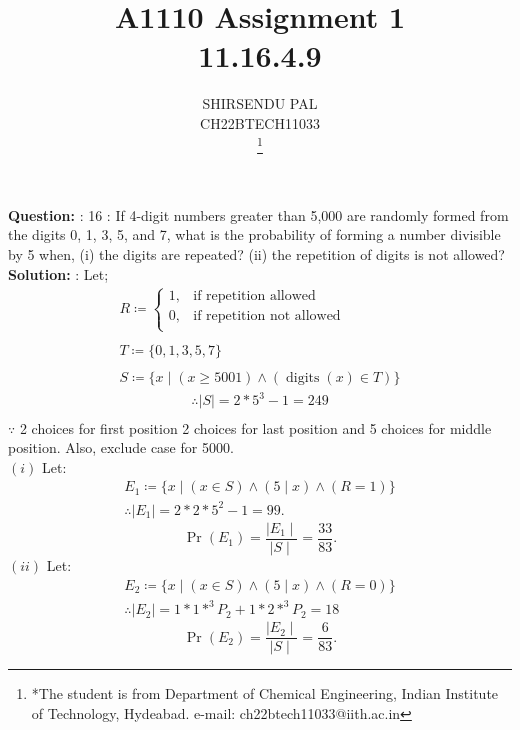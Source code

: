 \documentclass[journal,12pt,two column]{IEEEtran}
\title{A1110 Assignment 1 \\ 11.16.4.9}
\author{SHIRSENDU PAL \\ CH22BTECH11033 \\
        \thanks{*The student is from Department of Chemical Engineering, Indian Institute of Technology, Hydeabad. e-mail: ch22btech11033@iith.ac.in}}
\providecommand{\pr}[1]{\ensuremath{\Pr\left(#1\right)}}
\newcommand{\question}{\noindent \textbf{Question: }}
\newcommand{\solution}{\noindent \textbf{Solution: }}
\begin{document}
\maketitle
\question: 16 : If 4-digit numbers greater than 5,000 are randomly formed from the digits 0, 1, 3, 5, and 7, what is the probability of forming a number divisible by 5 when, (i) the digits are repeated? (ii) the repetition of digits is not allowed?\\
\solution : Let;
 \begin{align*} 
    R \coloneqq 
        \begin{cases}
            1, & \text{if repetition allowed}\\
            0, & \text{if repetition not allowed}\\
        \end{cases}
    \\ \\
    T \coloneqq \{0, 1, 3, 5, 7\}\\ \\
    S \coloneqq \{x \mid (x \geq 5001) \land (\operatorname{digits}(x) \in T)\}
 \end{align*}
 \begin{align*}
 	\therefore \mid S \mid = 2*5^3 -1 = 249 \\  
 \end{align*}
 $\because$ 2 choices for first position 2 choices for last position and 5 choices for middle position. Also, exclude case for 5000.\\
 $(i)$ Let:
  \begin{align*}
  	E_1 \coloneqq \{x \mid (x \in S)\land(5 \mid x)\land(R = 1)\}\\
        \therefore \mid E_1\mid = 2 * 2 * 5^2 -1 = 99.
  \end{align*}
  \begin{equation*}
    \pr{E_1} = \frac{\mid E_1 \mid}{\mid S \mid} = \frac{33}{83}.
  \end{equation*}
$(ii)$ Let:
    \begin{align*}
        E_2 \coloneqq \{x \mid (x \in S)\land(5 \mid x)\land (R=0)\}\\
        \therefore \mid E_2 \mid = 1*1*^3P_2 + 1*2*^3P_2 = 18
    \end{align*}
    \begin{equation*}
	    \pr{E_2} = \frac{\mid E_2 \mid}{\mid S \mid} = \frac{6}{83}.
    \end{equation*}
\end{document}
